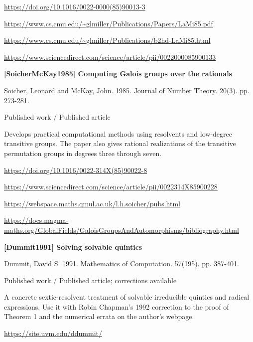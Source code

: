 \documentclass[11pt,a4paper,oneside,openany]{book}
\begin{document}
{\footnotesize\url{https://doi.org/10.1016/0022-0000(85)90013-3}}\par
{\footnotesize\url{https://www.cs.cmu.edu/~glmiller/Publications/Papers/LaMi85.pdf}}\par
{\footnotesize\url{https://www.cs.cmu.edu/~glmiller/Publications/b2hd-LaMi85.html}}\par
{\footnotesize\url{https://www.sciencedirect.com/science/article/pii/0022000085900133}}\par
\vspace{9pt}
\hypertarget{ref:SoicherMcKay1985}{}
{\sffamily\bfseries\color{atlasgreen}[SoicherMcKay1985] Computing Galois groups over the rationals}\par
\color{black} Soicher, Leonard and McKay, John. 1985. Journal of Number Theory. 20(3). pp. 273-281.\par
{\small\sffamily\color{atlasgold}Published work / Published article}\par
\color{black} Develops practical computational methods using resolvents and low-degree transitive groups. The paper also gives rational realizations of the transitive permutation groups in degrees three through seven.\par
{\footnotesize\url{https://doi.org/10.1016/0022-314X(85)90022-8}}\par
{\footnotesize\url{https://www.sciencedirect.com/science/article/pii/0022314X85900228}}\par
{\footnotesize\url{https://webspace.maths.qmul.ac.uk/l.h.soicher/pubs.html}}\par
{\footnotesize\url{https://docs.magma-maths.org/GlobalFields/GaloisGroupsAndAutomorphisms/bibliography.html}}\par
\vspace{9pt}
\hypertarget{ref:Dummit1991}{}
{\sffamily\bfseries\color{atlasgreen}[Dummit1991] Solving solvable quintics}\par
\color{black} Dummit, David S. 1991. Mathematics of Computation. 57(195). pp. 387-401.\par
{\small\sffamily\color{atlasgold}Published work / Published article; corrections available}\par
\color{black} A concrete sextic-resolvent treatment of solvable irreducible quintics and radical expressions. Use it with Robin Chapman's 1992 correction to the proof of Theorem 1 and the numerical errata on the author's webpage.\par
{\footnotesize\url{https://site.uvm.edu/ddummit/}}\par
\end{document}
